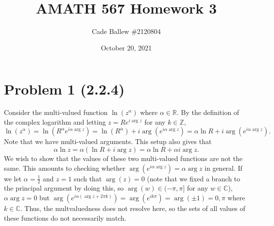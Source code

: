 \documentclass{article}
\title{AMATH 567 Homework 3}
\author{Cade Ballew \#2120804}
\date{October 20, 2021}
\begin{document}
\maketitle

\section{Problem 1 (2.2.4)}
Consider the multi-valued function $\ln(z^\alpha)$ where $\alpha\in\mathbb{R}$. By the definition of the complex logarithm and letting $z=Re^{i\arg z}$ for any $k\in\mathbb{Z}$, 
\[
\ln(z^\alpha)=\ln(R^\alpha e^{i\alpha\arg z})=\ln(R^\alpha)+i\arg(e^{i\alpha\arg z})=\alpha\ln R+i\arg(e^{i\alpha\arg z}).
\]
Note that we have multi-valued arguments. This setup also gives that
\[
\alpha\ln z=\alpha(\ln R+i\arg z)=\alpha\ln R+\alpha i\arg z.
\]
We wish to show that the values of these two multi-valued functions are not the same. This amounts to checking whether $\arg(e^{i\alpha\arg z})=\alpha \arg z$ in general. If we let $\alpha=\frac{1}{2}$ and $z=1$ such that $\arg(z)=0$ (note that we fixed a branch to the principal argument by doing this, so $\arg(w)\in(-\pi,\pi]$ for any $w\in\mathbb{C}$), $\alpha \arg z=0$ but $\arg(e^{i\alpha(\arg z+2\pi k)})=\arg(e^{ik\pi})=\arg(\pm1)=0,\pi$ where $k\in\mathbb{C}$. Thus, the multvaluedness does not resolve here, so the sets of all values of these functions do not necessarily match. 
\end{document}
